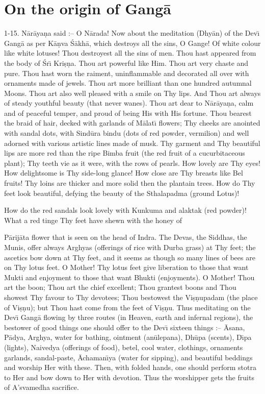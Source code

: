 \chapter{On the origin of Gang\=a}

1-15. N\=ar\=aya\d{n}a said :-- O N\=arada! Now about the meditation (Dhy\=an) of the Dev\={\i} Gang\=a as per K\=a\d{n}va \'S\=akh\=a, which destroys all the sins, O Gange! Of white colour like white lotuses! Thou destroyest all the sins of men. Thou hast appeared from the body of \'Sr\={\i} Kri\d{s}\d{n}a. Thou art powerful like Him. Thou art very chaste and pure. Thou hast worn the raiment, uninflammable and decorated all over with ornaments made of jewels. Thou art more brilliant than one hundred autumnal Moons. Thou art also well pleased with a smile on Thy lips. And Thou art always of steady youthful beauty (that never wanes). Thou art dear to N\=ar\=aya\d{n}a, calm and of peaceful temper, and proud of being His with His fortune. Thou bearest the braid of hair, decked with garlands of M\=alat\={\i} flowers; Thy cheeks are anointed with sandal dots, with Sind\=ura bindu (dots of red powder, vermilion) and well adorned with various artistic lines made of musk. Thy garment and Thy beautiful lips are more red than the ripe Bimba fruit (the red fruit of a cucurbitaceous plant); Thy teeth vie as it were, with the rows of pearls. How lovely are Thy eyes! How delightsome is Thy side-long glance! How close are Thy breasts like Bel fruits! Thy loins are thicker and more solid then the plantain trees. How do Thy feet look beautiful, defying the beauty of the Sthalapadma (ground Lotus)!

How do the red sandals look lovely with Kunkuma and alaktak (red powder)! What a red tinge Thy feet have shewn with the honey of

P\=arij\=ata flower that is seen on the head of Indra. The Devas, the Siddhas, the Munis, offer always Arghyas (offerings of rice with Durba grass) at Thy feet; the ascetics bow down at Thy feet, and it seems as though so many lines of bees are on Thy lotus feet. O Mother! Thy lotus feet give liberation to those that want Mukti and enjoyment to those that want Bhukti (enjoyments). O Mother! Thou art the boon; Thou art the chief excellent; Thou grantest boons and Thou showest Thy favour to Thy devotees; Thou bestowest the Vi\d{s}\d{n}upadam (the place of Vi\d{s}\d{n}u); but Thou hast come from the feet of Vi\d{s}\d{n}u. Thus meditating on the Dev\={\i} Gang\=a flowing by three routes (in Heaven, earth and infernal regions), the bestower of good things one should offer to the Dev\={\i} sixteen things :-- \=Asana, P\=adya, Arghya, water for bathing, ointment (an\=ulepana), Dh\=upa (scents), D\={\i}pa (lights), Naivedya (offerings of food), betel, cool water, clothings, ornaments garlands, sandal-paste, \=Achaman\={\i}ya (water for sipping), and beautiful beddings and worship Her with these. Then, with folded hands, one should perform stotra to Her and bow down to Her with devotion. Thus the worshipper gets the fruits of A'svamedha sacrifice.

